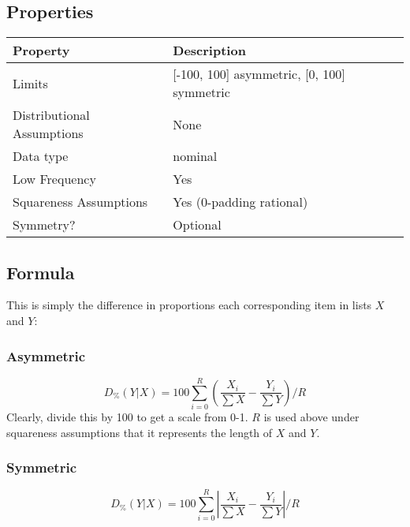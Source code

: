 \documentclass[11pt]{article}
\begin{document}
\subsection{Properties}
\begin{tabular}{| l || l |}
    \hline
    {\bf Property} & {\bf Description} \\
    \hline
    Limits & [-100, 100] asymmetric, [0, 100] symmetric\\ \hline

    Distributional Assumptions& None \\ \hline

    Data type & nominal \\ \hline

    Low Frequency & Yes \\ \hline

    Squareness Assumptions & Yes (0-padding rational) \\ \hline
    
    Symmetry? & Optional \\ \hline

\end{tabular}


\subsection{Formula}
This is simply the difference in proportions each corresponding item in lists $X$ and $Y$:

\subsubsection{Asymmetric}
$$
D_\%(Y|X) = { 100 \sum_{i=0}^{R}{ \left(  \frac{X_i}{\sum{X}} - \frac{Y_i}{\sum{Y}} \right) }  \bigg / R }
$$
Clearly, divide this by 100 to get a scale from 0-1.  $R$ is used above under squareness assumptions that it represents the length of $X$ and $Y$.

\subsubsection{Symmetric}
$$
D_\%(Y|X) = { 100 \sum_{i=0}^{R}{ \left|  \frac{X_i}{\sum{X}} - \frac{Y_i}{\sum{Y}} \right| }  \bigg / R }
$$
\end{document}
